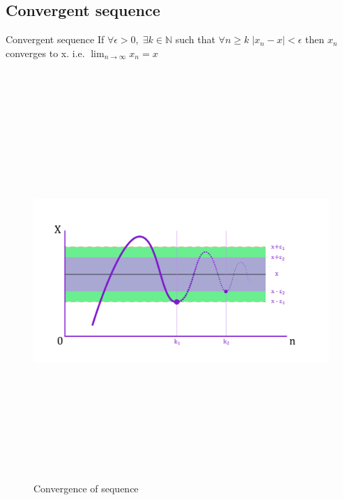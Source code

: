 \documentclass{article}
\begin{document}
\subsection*{Convergent sequence}
\begin{theorem}{Convergent sequence}{}
    If $\forall\epsilon>0,\; \exists k \in \mathbb{N}$\; such that $\forall n\geq k\;|x_n-x|<\epsilon$ then $x_n$ converges to x. i.e. $\lim_{n\to\infty}x_n=x$\\\\
\end{theorem}
\begin{figure}[H]
    \centering
    \includegraphics [width=15cm,height=15cm,keepaspectratio]{tex graphs-09.png}
    \caption{Convergence of sequence}
\end{figure}
\end{document}
